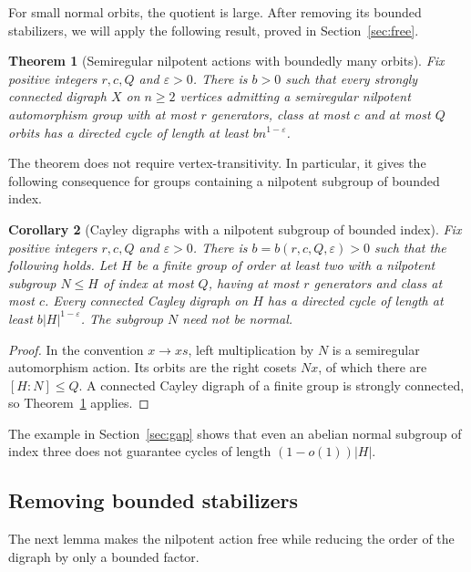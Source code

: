 \documentclass[11pt,a4paper,reqno]{amsart}
\newtheorem{theorem}{Theorem}[section]
\newtheorem{corollary}[theorem]{Corollary}
\theoremstyle{definition}
\theoremstyle{remark}
\numberwithin{equation}{section}
\newcommand{\eps}{\varepsilon}
\begin{document}
For small normal orbits, the quotient is large. After removing its bounded stabilizers, we will apply the following result, proved in Section~\ref{sec:free}.
\begin{theorem}[Semiregular nilpotent actions with boundedly many orbits]\label{thm:free}
Fix positive integers $r,c,Q$ and $\eps>0$. There is $b>0$ such that every strongly connected digraph $X$ on $n\ge2$ vertices admitting a semiregular nilpotent automorphism group with at most $r$ generators, class at most $c$ and at most $Q$ orbits has a directed cycle of length at least $bn^{1-\eps}$.
\end{theorem}

The theorem does not require vertex-transitivity. In particular, it gives the following consequence for groups containing a nilpotent subgroup of bounded index.

\begin{corollary}[Cayley digraphs with a nilpotent subgroup of bounded index]\label{cor:bounded-index}
Fix positive integers $r,c,Q$ and $\eps>0$. There is $b=b(r,c,Q,\eps)>0$ such that the following holds. Let $H$ be a finite group of order at least two with a nilpotent subgroup $N\le H$ of index at most $Q$, having at most $r$ generators and class at most $c$. Every connected Cayley digraph on $H$ has a directed cycle of length at least $b|H|^{1-\eps}$. The subgroup $N$ need not be normal.
\end{corollary}
\begin{proof}
In the convention $x\to xs$, left multiplication by $N$ is a semiregular automorphism action. Its orbits are the right cosets $Nx$, of which there are $[H:N]\le Q$. A connected Cayley digraph of a finite group is strongly connected, so Theorem~\ref{thm:free} applies.
\end{proof}

The example in Section~\ref{sec:gap} shows that even an abelian normal subgroup of index three does not guarantee cycles of length $(1-o(1))|H|$.

\subsection{Removing bounded stabilizers}
The next lemma makes the nilpotent action free while reducing the order of the digraph by only a bounded factor.
\end{document}
